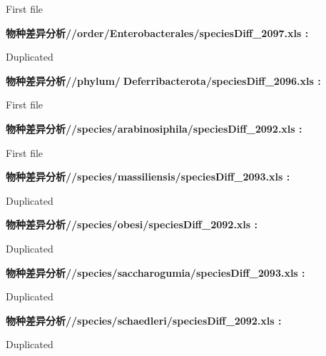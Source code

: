 \documentclass[
]{article}
\begin{document}
\begin{center}
\begin{tcolorbox}[colback=gray!10, colframe=gray!50, width=0.9\linewidth, arc=1mm, boxrule=0.5pt]
\vspace{0.5em}

    First file

\vspace{2em}


\textbf{
物种差异分析//order/Enterobacterales/speciesDiff\_2097.xls
:}

\vspace{0.5em}

    Duplicated

\vspace{2em}


\textbf{
物种差异分析//phylum/Deferribacterota/speciesDiff\_2096.xls
:}

\vspace{0.5em}

    First file

\vspace{2em}


\textbf{
物种差异分析//species/arabinosiphila/speciesDiff\_2092.xls
:}

\vspace{0.5em}

    First file

\vspace{2em}


\textbf{
物种差异分析//species/massiliensis/speciesDiff\_2093.xls
:}

\vspace{0.5em}

    Duplicated

\vspace{2em}


\textbf{
物种差异分析//species/obesi/speciesDiff\_2092.xls
:}

\vspace{0.5em}

    Duplicated

\vspace{2em}


\textbf{
物种差异分析//species/saccharogumia/speciesDiff\_2093.xls
:}

\vspace{0.5em}

    Duplicated

\vspace{2em}


\textbf{
物种差异分析//species/schaedleri/speciesDiff\_2092.xls
:}

\vspace{0.5em}

    Duplicated


\end{tcolorbox}
\end{center}
\end{document}
